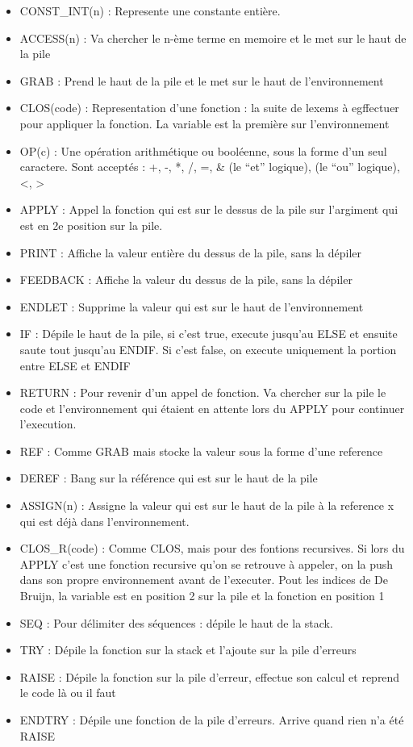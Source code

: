 \begin{itemize}
\item
  CONST\_INT(n) : Represente une constante entière.
\item
  ACCESS(n) : Va chercher le n-ème terme en memoire et le met sur le
  haut de la pile
\item
  GRAB : Prend le haut de la pile et le met sur le haut de
  l'environnement
\item
  CLOS(code) : Representation d'une fonction : la suite de lexems à
  egffectuer pour appliquer la fonction. La variable est la première sur
  l'environnement
\item
  OP(c) : Une opération arithmétique ou booléenne, sous la forme d'un
  seul caractere. Sont acceptés : +, -, *, /, =, \& (le ``et'' logique),
  \textbar{} (le ``ou'' logique), \textless{}, \textgreater{}
\item
  APPLY : Appel la fonction qui est sur le dessus de la pile sur
  l'argiment qui est en 2e position sur la pile.
\item
  PRINT : Affiche la valeur entière du dessus de la pile, sans la
  dépiler
\item
  FEEDBACK : Affiche la valeur du dessus de la pile, sans la dépiler
\item
  ENDLET : Supprime la valeur qui est sur le haut de l'environnement
\item
  IF : Dépile le haut de la pile, si c'est true, execute jusqu'au ELSE
  et ensuite saute tout jusqu'au ENDIF. Si c'est false, on execute
  uniquement la portion entre ELSE et ENDIF
\item
  RETURN : Pour revenir d'un appel de fonction. Va chercher sur la pile
  le code et l'environnement qui étaient en attente lors du APPLY pour
  continuer l'execution.
\item
  REF : Comme GRAB mais stocke la valeur sous la forme d'une reference
\item
  DEREF : Bang sur la référence qui est sur le haut de la pile
\item
  ASSIGN(n) : Assigne la valeur qui est sur le haut de la pile à la
  reference x qui est déjà dans l'environnement.
\item
  CLOS\_R(code) : Comme CLOS, mais pour des fontions recursives. Si lors
  du APPLY c'est une fonction recursive qu'on se retrouve à appeler, on
  la push dans son propre environnement avant de l'executer. Pout les
  indices de De Bruijn, la variable est en position 2 sur la pile et la
  fonction en position 1
\item
  SEQ : Pour délimiter des séquences : dépile le haut de la stack.
\item
  TRY : Dépile la fonction sur la stack et l'ajoute sur la pile
  d'erreurs
\item
  RAISE : Dépile la fonction sur la pile d'erreur, effectue son calcul
  et reprend le code là ou il faut
\item
  ENDTRY : Dépile une fonction de la pile d'erreurs. Arrive quand rien
  n'a été RAISE
\end{itemize}

